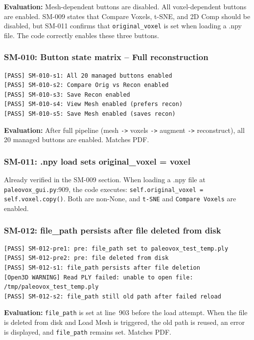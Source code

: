 \documentclass[12pt,a4paper]{article}
\begin{document}
\textbf{Evaluation:} Mesh-dependent buttons are disabled. All voxel-dependent
buttons are enabled. SM-009 states that Compare Voxels, t-SNE, and 2D Comp
should be disabled, but SM-011 confirms that \texttt{original\_voxel} is set
when loading a .npy file. The code correctly enables these three buttons.

\subsubsection{SM-010: Button state matrix -- Full reconstruction}

\begin{lstlisting}
[PASS] SM-010-s1: All 20 managed buttons enabled
[PASS] SM-010-s2: Compare Orig vs Recon enabled
[PASS] SM-010-s3: Save Recon enabled
[PASS] SM-010-s4: View Mesh enabled (prefers recon)
[PASS] SM-010-s5: Save Mesh enabled (saves recon)
\end{lstlisting}

\textbf{Evaluation:} After full pipeline (mesh \texttt{->} voxels \texttt{->}
augment \texttt{->} reconstruct), all 20 managed buttons are enabled. Matches PDF.

\subsubsection{SM-011: .npy load sets original\_voxel = voxel}

Already verified in the SM-009 section. When loading a .npy file at
\texttt{paleovox\_gui.py}:909, the code executes:
\texttt{self.original\_voxel = self.voxel.copy()}.
Both are non-None, and \texttt{t-SNE} and \texttt{Compare Voxels} are enabled.

\subsubsection{SM-012: file\_path persists after file deleted from disk}

\begin{lstlisting}
[PASS] SM-012-pre1: pre: file_path set to paleovox_test_temp.ply
[PASS] SM-012-pre2: pre: file deleted from disk
[PASS] SM-012-s1: file_path persists after file deletion
[Open3D WARNING] Read PLY failed: unable to open file: /tmp/paleovox_test_temp.ply
[PASS] SM-012-s2: file_path still old path after failed reload
\end{lstlisting}

\textbf{Evaluation:} \texttt{file\_path} is set at line~903 before the load
attempt. When the file is deleted from disk and Load Mesh is triggered,
the old path is reused, an error is displayed, and \texttt{file\_path}
remains set. Matches PDF.
\end{document}
